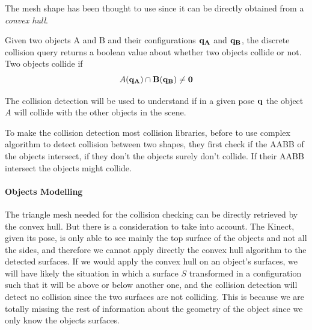 The mesh shape has been thought to use since it can be directly obtained from a \textit{convex hull}. 

Given two objects A and B and their configurations $\bf{q_A}$ and $\bf{q_B}$, the discrete collision query returns a boolean value about whether two objects collide or not. Two objects collide if
\[
A(\bf{q_A}) \cap B(\bf{q_B}) \neq 0
\]

The collision detection will be used to understand if in a given pose $\bf{q}$ the object $A$ will collide with the other objects in the scene.

To make the collision detection most collision libraries, before to use complex algorithm to detect collision between two shapes, they first check if the AABB of the objects intersect, if they don't the objects surely don't collide. If their AABB intersect the objects might collide.

\paragraph{Objects Modelling}
The triangle mesh needed for the collision checking can be directly retrieved by the convex hull. But there is a consideration to take into account. The Kinect, given its pose, is only able to see mainly the top surface of the objects and not all the sides, and therefore we cannot apply directly the convex hull algorithm to the detected surfaces. If we would apply the convex hull on an object's surfaces, we will have likely the situation in which a surface $S$ transformed in a configuration such that it will be above or below another one, and the collision detection will detect no collision since the two surfaces are not colliding. This is because we are totally missing the rest of information about the geometry of the object since we only know the objects surfaces.

